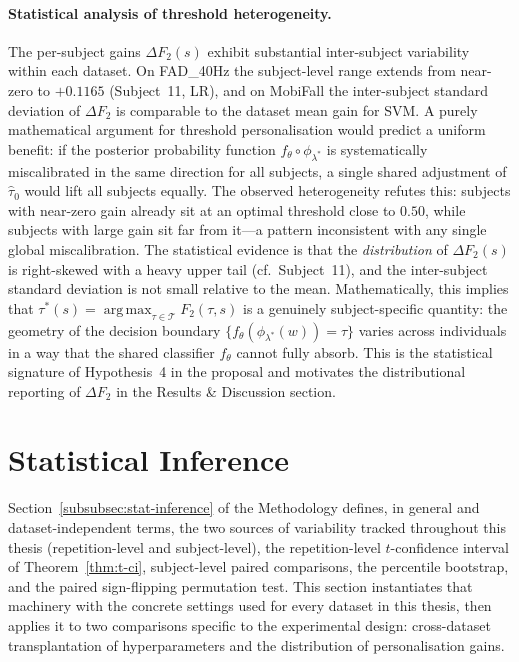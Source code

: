 \documentclass[onluarkali,ingilizce,yukseklisans,karton,LisansustuEgitim]{itutez}
\DeclareMathOperator*{\argmax}{arg\,max}
\providecommand{\1}{\mathbf{1}}
\begin{document}
\paragraph{Statistical analysis of threshold heterogeneity.}
The per-subject gains $\Delta F_2(s)$ exhibit substantial inter-subject variability within
each dataset.  On FAD\_40Hz the subject-level range extends from near-zero to
$+0.1165$ (Subject~11, LR), and on MobiFall the inter-subject standard deviation of
$\Delta F_2$ is comparable to the dataset mean gain for SVM.  A purely mathematical
argument for threshold personalisation would predict a uniform benefit: if the posterior
probability function $f_\theta\circ\phi_{\lambda^*}$ is systematically miscalibrated in
the same direction for all subjects, a single shared adjustment of $\hat\tau_0$
would lift all subjects equally.  The observed heterogeneity refutes this: subjects with
near-zero gain already sit at an optimal threshold close to $0.50$, while subjects with
large gain sit far from it---a pattern inconsistent with any single global miscalibration.
The statistical evidence is that the \emph{distribution} of $\Delta F_2(s)$ is
right-skewed with a heavy upper tail (cf.\ Subject~11), and the inter-subject standard
deviation is not small relative to the mean.  Mathematically, this implies that
$\tau^*(s) = \argmax_{\tau\in\mathcal{T}}F_2(\tau,s)$ is a genuinely subject-specific
quantity: the geometry of the decision boundary $\{f_\theta(\phi_{\lambda^*}(w))=\tau\}$
varies across individuals in a way that the shared classifier $f_\theta$ cannot
fully absorb.  This is the statistical signature of Hypothesis~4 in the proposal and
motivates the distributional reporting of $\Delta F_2$ in the Results \& Discussion
section.


\section{Statistical Inference}
\label{subsec:stat_inference}

Section~\ref{subsubsec:stat-inference} of the Methodology defines, in general and dataset-independent terms, the two sources of variability tracked throughout this thesis (repetition-level and subject-level), the repetition-level $t$-confidence interval of Theorem~\ref{thm:t-ci}, subject-level paired comparisons, the percentile bootstrap, and the paired sign-flipping permutation test. This section instantiates that machinery with the concrete settings used for every dataset in this thesis, then applies it to two comparisons specific to the experimental design: cross-dataset transplantation of hyperparameters and the distribution of personalisation gains.
\end{document}
